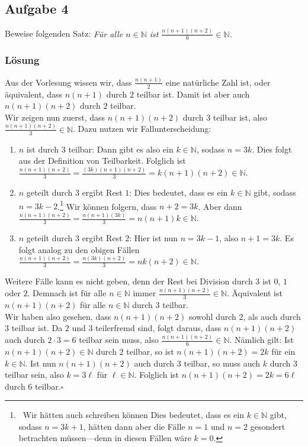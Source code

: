 \documentclass[a4paper,10pt]{article}
\newcommand{\N}{\mathbb{N}}
\newcommand{\s}[1]{#1}
\begin{document}
\subsection*{Aufgabe 4}
    Beweise folgenden Satz: \textit{Für alle $n \in \N$ ist $\frac{n(n+1)(n+2)}{6} \in \N$.}
\s{\subsubsection*{Lösung}
Aus der Vorlesung wissen wir, dass $\frac{n(n+1)}{2}$ eine natürliche Zahl ist, oder äquivalent, dass $n(n+1)$ durch $2$ teilbar ist. Damit ist aber auch $n(n+1)(n+2)$ durch $2$ teilbar.\\
Wir zeigen nun zuerst, dass $n(n+1)(n+2)$ durch $3$ teilbar ist, also $\frac{n(n+1)(n+2)}{3} \in \N$. Dazu nutzen wir Fallunterscheidung:
\begin{enumerate}
    \item $n$ ist durch $3$ teilbar: Dann gibt es also ein $k \in \N$, sodass $n = 3k$. Dies folgt aus der Definition von Teilbarkeit. Folglich ist $\frac{n(n+1)(n+2)}{3} = \frac{(3k)(n+1)(n+2)}{3} = k(n+1)(n+2) \in \N$.
    \item $n$ geteilt durch $3$ ergibt Rest $1$: Dies bedeutet, dass es ein $k \in \N$ gibt, sodass $n = 3k - 2$.\footnote{\ Wir hätten auch schreiben können \flqq Dies bedeutet, dass es ein $k \in \N$ gibt, sodass $n = 3k + 1$\frqq, hätten dann aber die Fälle $n = 1$ und $n = 2$ gesondert betrachten müssen---denn in diesen Fällen wäre $k = 0$.} Wir können folgern, dass $n + 2 = 3k$. Aber dann $\frac{n(n+1)(n+2)}{3} = \frac{n(n+1)(3k)}{3} = n(n+1)k \in \N$.
    \item $n$ geteilt durch $3$ ergibt Rest $2$: Hier ist nun $n = 3k-1$, also $n+1 = 3k$. Es folgt analog zu den obigen Fällen $\frac{n(n+1)(n+2)}{3} = \frac{n(3k)(n+2)}{3} = nk(n+2) \in \N$.
\end{enumerate}
Weitere Fälle kann es nicht geben, denn der Rest bei Division durch $3$ ist $0$, $1$ oder $2$. Demnach ist für alle $n \in \N$ immer $\frac{n(n+1)(n+2)}{3} \in \N$. Äquivalent ist $n(n+1)(n+2)$ für alle $n \in \N$ durch $3$ teilbar.\\
Wir haben also gesehen, dass $n(n+1)(n+2)$ sowohl durch $2$, als auch durch $3$ teilbar ist. Da $2$ und $3$ teilerfremd sind, folgt daraus, dass $n(n+1)(n+2)$ auch durch $2\cdot 3 = 6$ teilbar sein muss, also $\frac{n(n+1)(n+2)}{6} \in \N$. Nämlich gilt: Ist $n(n+1)(n+2) \in \N$ durch $2$ teilbar, so ist $n(n+1)(n+2) = 2k$ für ein $k \in \N$. Ist nun $n(n+1)(n+2)$ auch durch $3$ teilbar, so muss auch $k$ durch $3$ teilbar sein, also $k = 3\ell$ für $\ell \in \N$. Folglich ist $n(n+1)(n+2) = 2k = 6 \ell$ durch $6$ teilbar.\hfill$\square$
}
\end{document}
